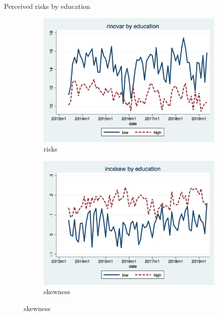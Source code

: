 \documentclass{beamer}
\begin{document}


\begin{frame}{Perceived risks by education}
	\begin{figure}[ht]
		\label{ts_incvar_educ_g_mean}
		\begin{subfigure}[b]{0.46\textwidth}
			\centering
			\caption{risks}
			\includegraphics[width=\textwidth, height = 0.33\textheight]{figures/ts_rincvar_edu_g_mean.png}
		\end{subfigure}
		\begin{subfigure}[b]{0.46\textwidth}
			\caption{skewness}
			\includegraphics[width=\textwidth, height = 0.33\textheight]{figures/ts_incskew_edu_g_mean.png}

\end{subfigure}
\end{figure}
\end{frame}
\end{document}
